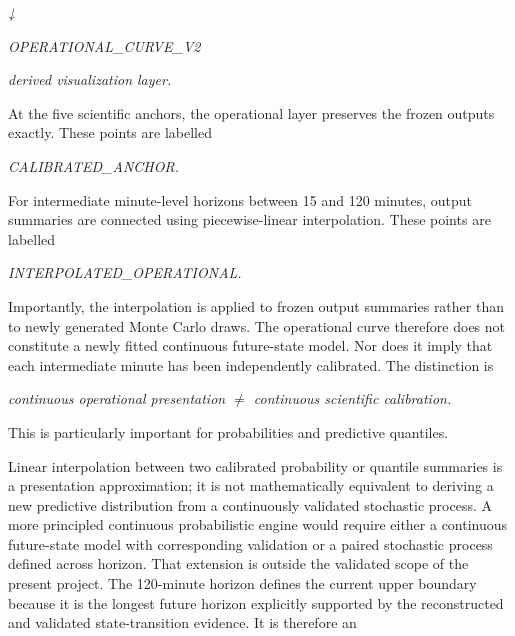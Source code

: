 \begin{center}\textit{↓}\end{center}

\begin{center}\textit{OPERATIONAL\_CURVE\_V2}\end{center}

\begin{center}\textit{derived visualization layer.}\end{center}

At the five scientific anchors, the operational layer preserves the frozen outputs exactly. These points are labelled

\begin{center}\textit{CALIBRATED\_ANCHOR.}\end{center}

For intermediate minute-level horizons between 15 and 120 minutes, output summaries are connected using piecewise-linear interpolation. These points are labelled

\begin{center}\textit{INTERPOLATED\_OPERATIONAL.}\end{center}

Importantly, the interpolation is applied to frozen output summaries rather than to newly generated Monte Carlo draws. The operational curve therefore does not constitute a newly fitted continuous future-state model. Nor does it imply that each intermediate minute has been independently calibrated. The distinction is

\begin{center}\textit{continuous operational presentation \ensuremath{\neq} continuous scientific calibration.}\end{center}

This is particularly important for probabilities and predictive quantiles.

Linear interpolation between two calibrated probability or quantile summaries is a presentation approximation; it is not mathematically equivalent to deriving a new predictive distribution from a continuously validated stochastic process. A more principled continuous probabilistic engine would require either a continuous future-state model with corresponding validation or a paired stochastic process defined across horizon. That extension is outside the validated scope of the present project. The 120-minute horizon defines the current upper boundary because it is the longest future horizon explicitly supported by the reconstructed and validated state-transition evidence. It is therefore an

